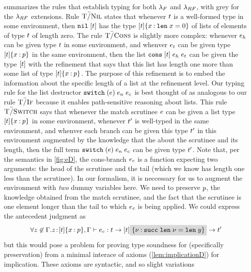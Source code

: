  summarizes
the rules that establish typing for both $\lambda_{F}$ and
$\lambda_{RF}$, with grey %
for the $\lambda_{RF}$ extensions.
%
Rule $\textsc{T\=/Nil}$ states that whenever $t$ is a well-formed
type in some environment, then  $\texttt{nil}\;[{t}]$ has the type
${{[t]}\{x \mathbin{:} \mathtt{len}\; x = 0\}}$ of lists of elements
of type $t$ of length zero.
%
The rule $\textsc{T\=/Cons}$ is slightly more complex: whenever $e_h$
can be given type $t$ in some environment, and whenver
$e_t$ can be given type
${{[t]}\{x \mathbin{:} p\}}$ in the same environment,
then the list $\texttt{cons}\;[{t}]\;{e_h}\;{e_t}$ can be given
the type $[t]$ with the refinement that says that
this list has length one more than some list of type
${{[t]}\{x \mathbin{:} p\}}$.
%
The purpose of this refinement is to embed the information about
the specific length of a list at the refinement level.
%
Our typing rule for the list destructor 
${{\texttt{switch}}}\;({e})\;{e_n}\;{e_c}$ is 
best thought of as analogous to our rule $\textsc{T\=/If}$
because it enables path-sensitive reasoning about lists.
%
This rule $\textsc{T\=/Switch}$ says that whenever the match scrutinee
$e$ can be given a list type 
${{[t]}\{x \mathbin{:} p\}}$ in some environment,
whenever $t'$ is well-typed in the same environment,
and whenver each branch can be given this type
$t'$ in this environment augmented by the knowledge 
that the about the scrutinee and its length, then the full
term ${{\texttt{switch}}}\;({e})\;{e_n}\;{e_c}$ can be given type
$t'$. 
%
Note that, per the semantics in \ref{fig:eD}, the cons-branch
$e_c$ is a function expecting two arguments: the head
of the scrutinee and the tail (which we know has length
one less than the scrutinee).
%
In our formalism, it is neccessary for us to augment the 
environment with \emph{two} dummy variables here. We need
to preserve $p$,
the knowledge obtained from the match scrutinee,
and the fact that the scrutinee is one element longer than
the tail to which $e_c$ is being applied.
%
We could express the antecedent judgment as
\[
\forall\notmem{z}{\tcenv}. 
  \hastype{\bind{z}{\breft{\tlist{\stype}}{x}{p},\tcenv}}
     {\sexpr_c}
     {\funcftype{\stype}{\funcftype{\tlist{\stype}\greybox{\breft{}{\vv}{\suc \len \vv = \len y}}}{\stype'}}}
\]
but this would pose a problem for proving type soundness 
for \sysrfd (specifically preservation)
from a minimal interace of axioms (\ref{lem:implicationD}) 
for implication.
%
These axioms are syntactic, and so slight variations



